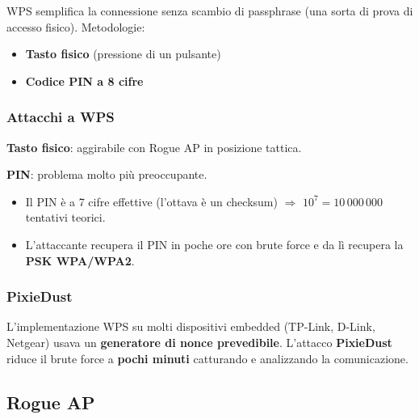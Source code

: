WPS semplifica la connessione senza scambio di passphrase (una sorta di prova di accesso fisico). Metodologie:
\begin{itemize}
  \item \textbf{Tasto fisico} (pressione di un pulsante)
  \item \textbf{Codice PIN a 8 cifre}
\end{itemize}

\subsubsection{Attacchi a WPS}

\textbf{Tasto fisico}: aggirabile con Rogue AP in posizione tattica.

\textbf{PIN}: problema molto pi\`u preoccupante.
\begin{itemize}
  \item Il PIN \`e a 7 cifre effettive (l'ottava \`e un checksum) $\Rightarrow$ $10^7 = 10\,000\,000$ tentativi teorici.
  \item L'attaccante recupera il PIN in poche ore con brute force e da l\`i recupera la \textbf{PSK WPA/WPA2}.
\end{itemize}


\subsubsection{PixieDust}

L'implementazione WPS su molti dispositivi embedded (TP-Link, D-Link, Netgear) usava un \textbf{generatore di nonce prevedibile}. L'attacco \textbf{PixieDust} riduce il brute force a \textbf{pochi minuti} catturando e analizzando la comunicazione.


\subsection{Rogue AP}

